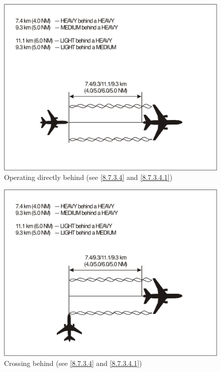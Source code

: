 \begin{enumerate}
\begin{enumerate}

        \vspace{0.5cm}
        \begin{figure}[!ht]
            \centering
            \includegraphics[width=13cm]{Images/Fig 8-1.png}
            \caption[Operating directly behind]{Operating directly behind (see \ref{8.7.3.4} and \ref{8.7.3.4.1})}
            \label{fig:8-1}
        \end{figure}

        \vfill
        \begin{figure}[!ht]
            \centering
            \includegraphics[width=13cm]{Images/Fig 8-2.png}
            \caption[Crossing behind]{Crossing behind (see \ref{8.7.3.4} and \ref{8.7.3.4.1})}
            \label{fig:8-2}
        \end{figure}
    \end{enumerate}
\end{enumerate}

